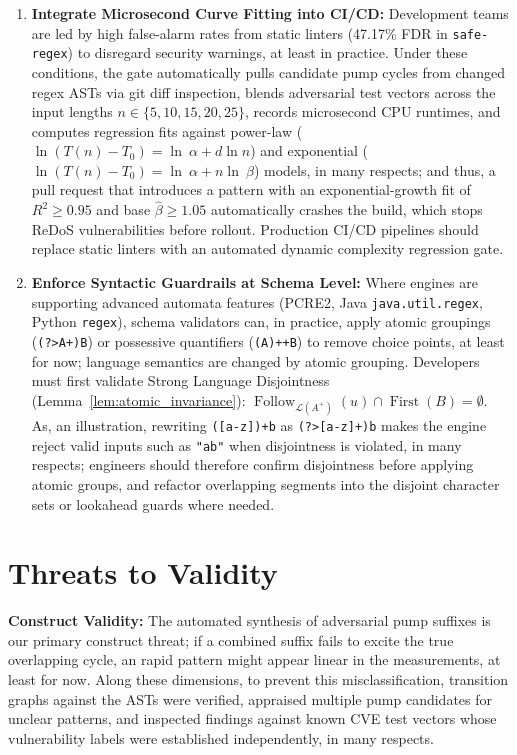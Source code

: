 \documentclass{ieeeaccess}
\begin{document}
\begin{enumerate}
    \item \textbf{Integrate Microsecond Curve Fitting into CI/CD:} Development teams are led by high false-alarm rates from static linters (47.17\% FDR in \texttt{safe-regex}) to disregard security warnings, at least in practice. Under these conditions, the gate automatically pulls candidate pump cycles from changed regex ASTs via git diff inspection, blends adversarial test vectors across the input lengths $n \in \{5, 10, 15, 20, 25\}$, records microsecond CPU runtimes, and computes regression fits against power-law ($\ln(T(n) - T_0) = \ln\ \alpha + d \ln n$) and exponential ($\ln(T(n) - T_0) = \ln\ \alpha + n \ln\ \beta$) models, in many respects; and thus, a pull request that introduces a pattern with an exponential-growth fit of $R^2 \ge 0.95$ and base $\hat{\beta} \ge 1.05$ automatically crashes the build, which stops ReDoS vulnerabilities before rollout. Production CI/CD pipelines should replace static linters with an automated dynamic complexity regression gate.
    \item \textbf{Enforce Syntactic Guardrails at Schema Level:} Where engines are supporting advanced automata features (PCRE2, Java \texttt{java.util.regex}, Python \texttt{regex}), schema validators can, in practice, apply atomic groupings (\texttt{(?>A+)B}) or possessive quantifiers (\texttt{(A)++B}) to remove choice points, at least for now; language semantics are changed by atomic grouping. Developers must first validate Strong Language Disjointness (Lemma~\ref{lem:atomic_invariance}): $\operatorname{Follow}_{\mathcal{L}(A^+)}(u) \cap \operatorname{First}(B) = \emptyset$. As, an illustration, rewriting \texttt{([a-z])+b} as \texttt{(?>[a-z]+)b} makes the engine reject valid inputs such as \texttt{"ab"} when disjointness is violated, in many respects; engineers should therefore confirm disjointness before applying atomic groups, and refactor overlapping segments into the disjoint character sets or lookahead guards where needed.
\end{enumerate}

\section{Threats to Validity}\label{sec:threats}
\textbf{Construct Validity:} The automated synthesis of adversarial pump suffixes is our primary construct threat; if a combined suffix fails to excite the true overlapping cycle, an rapid pattern might appear linear in the measurements, at least for now. Along these dimensions, to prevent this misclassification, transition graphs against the ASTs were verified, appraised multiple pump candidates for unclear patterns, and inspected findings against known CVE test vectors whose vulnerability labels were established independently, in many respects.
\end{document}
